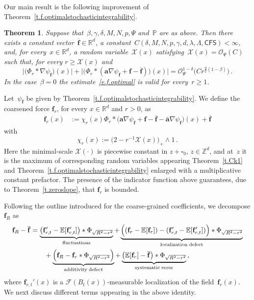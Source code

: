 \documentclass[11pt]{article} %
\let\oldsquare\square %
\renewcommand{\square}{\oldsquare}
\numberwithin{equation}{section}
\newtheorem{theorem}{Theorem}[section]
\theoremstyle{definition}
\newcommand*{\Z}{\ensuremath{\mathbb{Z}}}
\newcommand*{\R}{\ensuremath{\mathbb{R}}}
\newcommand*{\Rd}{\ensuremath{\mathbb{R}^d}}
\newcommand{\f}{\mathbf{f}}
\renewcommand{\a}{\mathbf{a}}
\newcommand{\ahom}{\bar{\a}}
\newcommand{\cu}{\square}
\newcommand{\F}{\mathcal{F}}
\renewcommand{\P}{\mathbb{P}}
\newcommand{\E}{\mathbb{E}}
\newcommand{\X}{\mathcal{X}}
\renewcommand{\O}{\mathcal{O}}
\newcommand{\minscale}{\chi}
\newcommand{\CFS}{\mathsf{CFS}}
\begin{document}
Our main result is the following improvement of Theorem~\ref{t.f.optimalstochasticintegrability}. 

\begin{theorem} \label{t.f.optimal}
Suppose that~$\beta,\gamma,\delta,M,N,p,\Psi$ and~$\P$ are as above. Then there exists a constant vector~$\overline{\f}\in \Rd$, a constant~$C(\delta,M,N,p,\gamma,d,\lambda,\Lambda,\CFS)<\infty$, and, for every~$x \in \R^d$, a random variable~$\X(x)$ satisfying~$\X(x) = \O_{\Psi}(C)$ such that, for every $r \geq \X(x)$ and 
\begin{equation} \label{e.f.optimal}
\bigl| \bigl(\Phi_r \ast \nabla \psi_\f \bigr)(x) \bigr| + 
\bigl| \bigl( \Phi_r \ast (\a \nabla \psi_\f + \f - \overline{\f})\bigr) (x) \bigr| 
= 
\O_\Psi^{1-\delta}\bigl(C r^{\frac d2(1-\beta)}\bigr) \,.
\end{equation}
In the case~$\beta=0$ the estimate~\eqref{e.f.optimal} is valid for every~$r\geq 1$. 
\end{theorem}





\smallskip






Let~$\psi_\f$ be given by Theorem~\ref{t.f.optimalstochasticintegrability}. We define the coarsened force $\f_r$, for every $x \in \R^d$ and $r >0$, as  
\begin{align}  \label{e.fr}
\f_r(x) & :=  \chi_r(x) \Phi_r \ast  \bigl( \a \nabla \psi_\f + \f - \overline{\f}  - \ahom \nabla \psi_\f \bigr) (x) 
+  \overline{\f}
\end{align}
with
\begin{equation*}  
\minscale_r(x) := \bigl(2 - r^{-1} \X(x) \bigr)_+ \wedge 1
\,.
\end{equation*}
Here the minimal-scale $\X(\cdot)$ is piecewise constant in $z + \cu_0$, $z \in \Z^d$, and at~$z$ it is the maximum of corresponding random variables appearing  Theorem~\ref{t.Ck1} and Theorem~\ref{t.f.optimalstochasticintegrability} enlarged with a multiplicative  constant prefactor.  The presence of the indicator function above guarantees, due to Theorem~\ref{t.zeroslope}, that $\f_r$ is bounded. 

\smallskip

Following the outline introduced for the coarse-grained coefficients, we decompose $\f_R$ as
\begin{align} 
\label{e.fr.splitting}
\notag
\f_R - \overline{\f}
&
=
\underbrace{
\bigl( \f'_{r,t} - \E [ \f'_{r,t} ] \bigr) \ast \Phi_{\sqrt{R^2-r^2}}
}_{\mathrm{fluctuations}}
+
\underbrace{
\Bigl( (\f_r - \E [ \f_r ]) - (\f'_{r,t} - \E [ \f'_{r,t} ] )  \Bigr) \ast \Phi_{\sqrt{R^2-r^2}} 
}_{\mathrm{localization \; defect}}
\\   & \qquad
+
\underbrace{
\Bigl( \f_R - \f_r \ast \Phi_{\sqrt{R^2-r^2}} \Bigr) 
}_{\mathrm{additivity \; defect}}
+
\underbrace{
\bigl( \E [ \f_r ]- \overline{\f} \bigr) \ast \Phi_{\sqrt{R^2-r^2}}
}_{\mathrm{systematic \;  error}}
\,,
\end{align}
where $\f_{r,t}'(x)$ is a $\F(B_t(x))$-measurable localization of the field~$\f_r(x)$.  
We next discuss different terms appearing in the above identity. 
\end{document}
